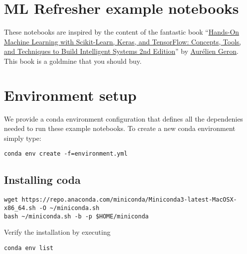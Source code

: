 \documentclass[]{scrartcl}
\date{}
\begin{document}
{
\hypersetup{linkcolor=black}
\setcounter{tocdepth}{3}
\tableofcontents
}
\section{ML Refresher example
notebooks}\label{ml-refresher-example-notebooks}

These notebooks are inspired by the content of the fantastic book
``\href{https://www.amazon.com/Hands-Machine-Learning-Scikit-Learn-TensorFlow/dp/1492032646/ref=sr_1_3?crid=3SRL70QAD46FM}{Hands-On
Machine Learning with Scikit-Learn, Keras, and TensorFlow: Concepts,
Tools, and Techniques to Build Intelligent Systems 2nd Edition}'' by
\href{https://twitter.com/aureliengeron}{Aurélien Geron}. This book is a
goldmine that you should buy.

\section{Environment setup}\label{environment-setup}

We provide a conda environment configuration that defines all the
dependenies needed to run these example notebooks. To create a new conda
environment simply type:

\begin{verbatim}
conda env create -f=environment.yml 
\end{verbatim}

\subsection{Installing coda}\label{installing-coda}

\begin{verbatim}
wget https://repo.anaconda.com/miniconda/Miniconda3-latest-MacOSX-x86_64.sh -O ~/miniconda.sh
bash ~/miniconda.sh -b -p $HOME/miniconda
\end{verbatim}

Verify the installation by executing

\begin{verbatim}
conda env list
\end{verbatim}
\end{document}
